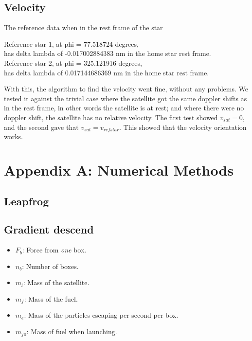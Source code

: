 \documentclass[a4paper, 10pt]{article}
\begin{document}
\subsection{Velocity}

The reference data when in the rest frame of the star

\begin{tcolorbox}
Reference star 1, at phi = 77.518724 degrees, \\
has delta lambda of  -0.017002884383 nm in the home star rest frame. \\
Reference star 2, at phi = 325.121916 degrees, \\
has delta lambda of   0.017144686369 nm in the home star rest frame. 
\end{tcolorbox}

With this, the algorithm to find the velocity went fine, without any problems. We tested it against the trivial case where the satellite got the same doppler shifts as in the rest frame, in other words  the satellite is at rest; and where there were no doppler shift, the satellite has no relative velocity. The first test showed $v_{sat} = 0$, and the second gave that $v_{sat} = v_{refstar}$. This showed that the velocity orientation works.






\section{Appendix A: Numerical Methods}
\subsection{Leapfrog}\label{sec:leap}

\subsection{Gradient descend}\label{sec:gradient}

 
\begin{itemize}
\item $F_b$: Force from \textit{one} box.
\item $n_b$: Number of boxes.
\item $m_l$: Mass of the satellite.
\item $m_f$: Mass of the fuel.
\item $m_e$: Mass of the particles escaping per second per box.
\item $m_{f0}$: Mass of fuel when launching.
\end{itemize}
\end{document}

